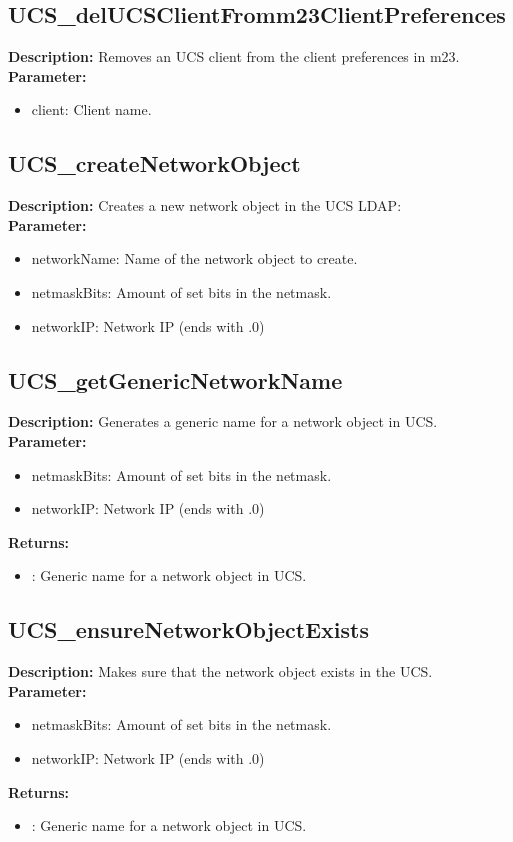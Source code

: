 \subsection{UCS\_delUCSClientFromm23ClientPreferences}
\textbf{Description:} Removes an UCS client from the client preferences in m23.\\
\textbf{Parameter:}
\begin{itemize}
\item client: Client name.
\end{itemize}

\subsection{UCS\_createNetworkObject}
\textbf{Description:} Creates a new network object in the UCS LDAP:\\
\textbf{Parameter:}
\begin{itemize}
\item networkName: Name of the network object to create.
\item netmaskBits: Amount of set bits in the netmask.
\item networkIP: Network IP (ends with .0)
\end{itemize}

\subsection{UCS\_getGenericNetworkName}
\textbf{Description:} Generates a generic name for a network object in UCS.\\
\textbf{Parameter:}
\begin{itemize}
\item netmaskBits: Amount of set bits in the netmask.
\item networkIP: Network IP (ends with .0)
\end{itemize}
\textbf{Returns:}
\begin{itemize}
\item : Generic name for a network object in UCS.
\end{itemize}

\subsection{UCS\_ensureNetworkObjectExists}
\textbf{Description:} Makes sure that the network object exists in the UCS.\\
\textbf{Parameter:}
\begin{itemize}
\item netmaskBits: Amount of set bits in the netmask.
\item networkIP: Network IP (ends with .0)
\end{itemize}
\textbf{Returns:}
\begin{itemize}
\item : Generic name for a network object in UCS.
\end{itemize}

